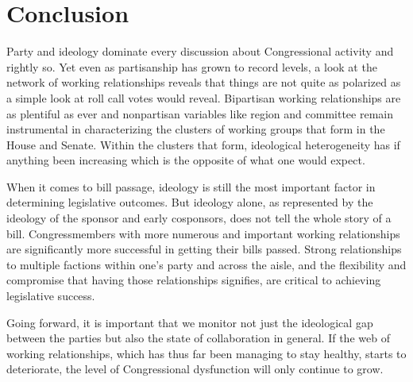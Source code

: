 \section{Conclusion}

Party and ideology dominate every discussion about Congressional activity and
rightly so. Yet even as partisanship has grown to record levels, a look at the
network of working relationships reveals that things are not quite as polarized
as a simple look at roll call votes would reveal. Bipartisan working
relationships are as plentiful as ever and nonpartisan variables like region and
committee remain instrumental in characterizing the clusters of working groups
that form in the House and Senate. Within the clusters that form, ideological
heterogeneity has if anything been increasing which is the opposite of what one
would expect.

When it comes to bill passage, ideology is still the most important factor in
determining legislative outcomes. But ideology alone, as represented by the
ideology of the sponsor and early cosponsors, does not tell the whole story of a
bill. Congressmembers with more numerous and important working relationships are
significantly more successful in getting their bills passed. Strong
relationships to multiple factions within one's party and across the aisle, and
the flexibility and compromise that having those relationships signifies, are
critical to achieving legislative success.

Going forward, it is important that we monitor not just the ideological gap
between the parties but also the state of collaboration in general. If the web
of working relationships, which has thus far been managing to stay healthy,
starts to deteriorate, the level of Congressional dysfunction will only
continue to grow.
